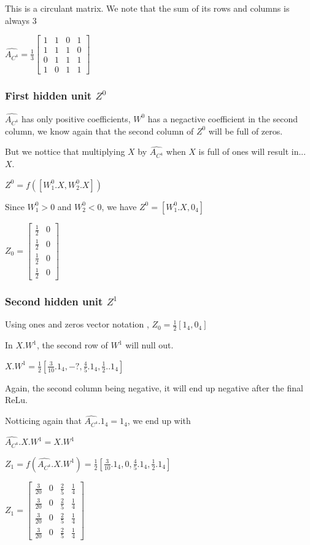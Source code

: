 \documentclass[a4paper]{article}
\begin{document}
This is a circulant matrix.
We note that the sum of its rows and columns is always $3$

$\hat{A_{C^4}} = 
\frac{1}{3} \begin{bmatrix}
    1 &  1 &  0 &  1\\
    1 &  1 &  1 &  0\\
    0 &  1 &  1 &  1\\
    1 &  0 &  1 &  1
\end{bmatrix}$
\subsubsection*{First hidden unit $Z^{0}$}
$\hat{A_{C^4}}$ has only positive coefficients, $W^0$ has a negactive coefficient in the second column, 
we know again that the second column of $Z^0$ will be full of zeros.

But we nottice that multiplying $X$ by $\hat{A_{C^4}}$ when $X$ is full of ones will result in... $X$.

$Z^{0} = f([W^{0}_{1}.X, W^{0}_{2}.X])$

Since $W^{0}_{1}>0$ and $W^{0}_{2}<0$, we have $Z^{0} = [W^{0}_{1}.X, 0_{4}]$

$Z_{0} = \left[\begin{matrix}\frac{1}{2} & 0\\\frac{1}{2} & 0\\\frac{1}{2} & 0\\\frac{1}{2} & 0\end{matrix}\right]$

\subsubsection*{Second hidden unit $Z^{1}$}

Using ones and zeros vector notation , $Z_{0} = \frac{1}{2} [1_{4}, 0_{4}]$

In $X.W^{1}$, the second row of $W^{1}$ will null out.

$X.W^{1} =\frac{1}{2} [\frac{3}{10}. 1_{4}, -?, \frac{4}{5} .1_{4}, \frac{1}{2}. .1_{4}]$

Again, the second column being negative, it will end up negative after the final ReLu.

Notticing again that $\hat{A_{C^4}}.1_{4} = 1_{4}$, we end up with 

$\hat{A_{C^4}}.X.W^{1} = X.W^{1}$

$Z_{1} = f(\hat{A_{C^4}}.X.W^{1}) = \frac{1}{2} [\frac{3}{10}. 1_{4}, 0, \frac{4}{5} .1_{4}, \frac{1}{2} .1_{4}]$

$Z_{1} = \left[\begin{matrix}\frac{3}{20} & 0 & \frac{2}{5} & \frac{1}{4}\\\frac{3}{20} & 0 & \frac{2}{5} & \frac{1}{4}\\\frac{3}{20} & 0 & \frac{2}{5} & \frac{1}{4}\\\frac{3}{20} & 0 & \frac{2}{5} & \frac{1}{4}\end{matrix}\right]$
% 
\end{document}
